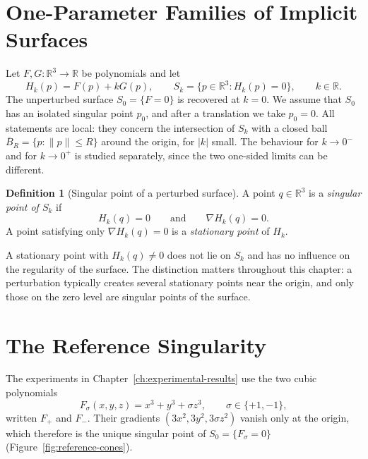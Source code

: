 \documentclass[12pt, a4paper, oneside]{book}
\theoremstyle{plain}
\theoremstyle{definition}
\newtheorem{definition}[theorem]{Definition}
\theoremstyle{remark}
\begin{document}
\section{One-Parameter Families of Implicit Surfaces}
\label{sec:families}

Let $F,G:\mathbb{R}^3\to\mathbb{R}$ be polynomials and let
\begin{equation}
\label{eq:perturbed-family}
H_k(p)=F(p)+kG(p),\qquad
S_k=\{p\in\mathbb{R}^3: H_k(p)=0\},\qquad k\in\mathbb{R}.
\end{equation}
The unperturbed surface $S_0=\{F=0\}$ is recovered at $k=0$. We assume that
$S_0$ has an isolated singular point $p_0$, and after a translation we take
$p_0=0$. All statements are local: they concern the intersection of $S_k$ with
a closed ball $\overline{B}_R=\{p:\|p\|\le R\}$ around the origin, for $|k|$ small.
The behaviour for $k\to0^-$ and for $k\to0^+$ is studied separately, since
the two one-sided limits can be different.

\begin{definition}[Singular point of a perturbed surface]
\label{def:singular-perturbed}
A point $q\in\mathbb{R}^3$ is a \emph{singular point of $S_k$} if
\begin{equation}
\label{eq:singularity-system}
H_k(q)=0
\qquad\text{and}\qquad
\nabla H_k(q)=0 .
\end{equation}
A point satisfying only $\nabla H_k(q)=0$ is a \emph{stationary point} of
$H_k$.
\end{definition}

A stationary point with
$H_k(q)\neq0$ does not lie on $S_k$ and has no influence on the regularity of
the surface. The distinction matters throughout this chapter: a perturbation
typically creates several stationary points near the origin, and only those on
the zero level are singular points of the surface.

\section{The Reference Singularity}
\label{sec:reference-singularity}

The experiments in Chapter~\ref{ch:experimental-results} use the two cubic
polynomials
\begin{equation}
\label{eq:F-sigma}
F_\sigma(x,y,z)=x^3+y^3+\sigma z^3,\qquad \sigma\in\{+1,-1\},
\end{equation}
written $F_+$ and $F_-$. Their gradients $(3x^2,3y^2,3\sigma z^2)$ vanish only
at the origin, which therefore is the unique singular point of
$S_0=\{F_\sigma=0\}$ (Figure~\ref{fig:reference-cones}).
\end{document}
